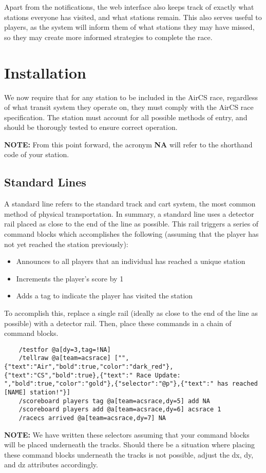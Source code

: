 \documentclass{article}
\begin{document}
Apart from the notifications, the web interface also keeps track of exactly what stations everyone has visited, and what stations remain. This also serves useful to players, as the system will inform them of what stations they may have missed, so they may create more informed strategies to complete the race. 

\pagebreak

\section{Installation}
We now require that for any station to be included in the AirCS race, regardless of what transit system they operate on, they must comply with the AirCS race specification. The station must account for all possible methods of entry, and should be thorougly tested to ensure correct operation.

\textbf{NOTE: } From this point forward, the acronym \textbf{NA} will refer to the shorthand code of your station.
\subsection{Standard Lines}
A standard line refers to the standard track and cart system, the most common method of physical transportation. In summary, a standard line uses a detector rail placed as close to the end of the line as possible. This rail triggers a series of command blocks which accomplishes the following (assuming that the player has not yet reached the station previously):
\begin{itemize}
    \item Announces to all players that an individual has reached a unique station
    \item Increments the player's score by 1
    \item Adds a tag to indicate the player has visited the station
\end{itemize}
To accomplish this, replace a single rail (ideally as close to the end of the line as possible) with a detector rail. Then, place these commands in a chain of command blocks.
\begin{lstlisting}
    /testfor @a[dy=3,tag=!NA]
    /tellraw @a[team=acsrace] ["",{"text":"Air","bold":true,"color":"dark_red"},{"text":"CS","bold":true},{"text":" Race Update: ","bold":true,"color":"gold"},{"selector":"@p"},{"text":" has reached [NAME] station!"}]
    /scoreboard players tag @a[team=acsrace,dy=5] add NA
    /scoreboard players add @a[team=acsrace,dy=6] acsrace 1
    /racecs arrived @a[team=acsrace,dy=7] NA
\end{lstlisting}
\textbf{NOTE:} We have written these selectors assuming that your command blocks will be placed underneath the tracks. Should there be a situation where placing these command blocks underneath the tracks is not possible, adjust the dx, dy, and dz attributes accordingly.
\end{document}
